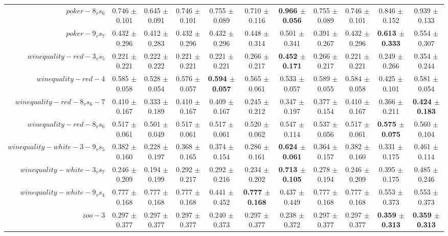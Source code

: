 \begin{table}[!ht]
{\begin{tabular}{r c c c c c c c c c c}
$poker-8_vs_6$ & 0.746 $\pm$ 0.101 & 0.645 $\pm$ 0.091 & 0.746 $\pm$ 0.101 & 0.755 $\pm$ 0.089 & 0.710 $\pm$ 0.116 & \textbf{0.966 $\pm$ 0.056} & 0.755 $\pm$ 0.089 & 0.746 $\pm$ 0.101 & 0.846 $\pm$ 0.152 & 0.939 $\pm$ 0.133 \\
$poker-9_vs_7$ & 0.432 $\pm$ 0.296 & 0.412 $\pm$ 0.283 & 0.432 $\pm$ 0.296 & 0.432 $\pm$ 0.296 & 0.448 $\pm$ 0.314 & 0.501 $\pm$ 0.341 & 0.391 $\pm$ 0.267 & 0.432 $\pm$ 0.296 & \textbf{0.613 $\pm$ 0.333} & 0.554 $\pm$ 0.307 \\
$winequality-red-3_vs_5$ & 0.221 $\pm$ 0.221 & 0.222 $\pm$ 0.222 & 0.221 $\pm$ 0.221 & 0.221 $\pm$ 0.221 & 0.266 $\pm$ 0.217 & \textbf{0.452 $\pm$ 0.171} & 0.266 $\pm$ 0.217 & 0.221 $\pm$ 0.221 & 0.249 $\pm$ 0.266 & 0.354 $\pm$ 0.244 \\
$winequality-red-4$ & 0.585 $\pm$ 0.058 & 0.528 $\pm$ 0.054 & 0.576 $\pm$ 0.057 & \textbf{0.594 $\pm$ 0.057} & 0.565 $\pm$ 0.061 & 0.533 $\pm$ 0.057 & 0.589 $\pm$ 0.055 & 0.584 $\pm$ 0.058 & 0.425 $\pm$ 0.101 & 0.581 $\pm$ 0.054 \\
$winequality-red-8_vs_6-7$ & 0.410 $\pm$ 0.167 & 0.333 $\pm$ 0.189 & 0.410 $\pm$ 0.167 & 0.409 $\pm$ 0.167 & 0.245 $\pm$ 0.212 & 0.347 $\pm$ 0.197 & 0.377 $\pm$ 0.154 & 0.410 $\pm$ 0.167 & 0.366 $\pm$ 0.211 & \textbf{0.424 $\pm$ 0.183} \\
$winequality-red-8_vs_6$ & 0.517 $\pm$ 0.061 & 0.501 $\pm$ 0.049 & 0.517 $\pm$ 0.061 & 0.517 $\pm$ 0.061 & 0.520 $\pm$ 0.062 & 0.547 $\pm$ 0.114 & 0.537 $\pm$ 0.056 & 0.517 $\pm$ 0.061 & \textbf{0.575 $\pm$ 0.075} & 0.560 $\pm$ 0.104 \\
$winequality-white-3-9_vs_5$ & 0.382 $\pm$ 0.160 & 0.228 $\pm$ 0.197 & 0.368 $\pm$ 0.165 & 0.374 $\pm$ 0.154 & 0.286 $\pm$ 0.161 & \textbf{0.624 $\pm$ 0.061} & 0.364 $\pm$ 0.157 & 0.382 $\pm$ 0.160 & 0.331 $\pm$ 0.175 & 0.461 $\pm$ 0.114 \\
$winequality-white-3_vs_7$ & 0.246 $\pm$ 0.209 & 0.194 $\pm$ 0.199 & 0.292 $\pm$ 0.217 & 0.292 $\pm$ 0.216 & 0.234 $\pm$ 0.202 & \textbf{0.713 $\pm$ 0.105} & 0.278 $\pm$ 0.194 & 0.246 $\pm$ 0.209 & 0.395 $\pm$ 0.175 & 0.485 $\pm$ 0.246 \\
$winequality-white-9_vs_4$ & 0.777 $\pm$ 0.168 & 0.777 $\pm$ 0.168 & 0.777 $\pm$ 0.168 & 0.441 $\pm$ 0.452 & \textbf{0.777 $\pm$ 0.168} & 0.437 $\pm$ 0.449 & 0.777 $\pm$ 0.168 & 0.777 $\pm$ 0.168 & 0.553 $\pm$ 0.373 & 0.553 $\pm$ 0.373 \\
$zoo-3$ & 0.297 $\pm$ 0.377 & 0.297 $\pm$ 0.377 & 0.297 $\pm$ 0.377 & 0.240 $\pm$ 0.373 & 0.297 $\pm$ 0.377 & 0.238 $\pm$ 0.372 & 0.297 $\pm$ 0.377 & 0.297 $\pm$ 0.377 & \textbf{0.359 $\pm$ 0.313} & \textbf{0.359 $\pm$ 0.313} \\

\end{tabular}}
\end{table}
